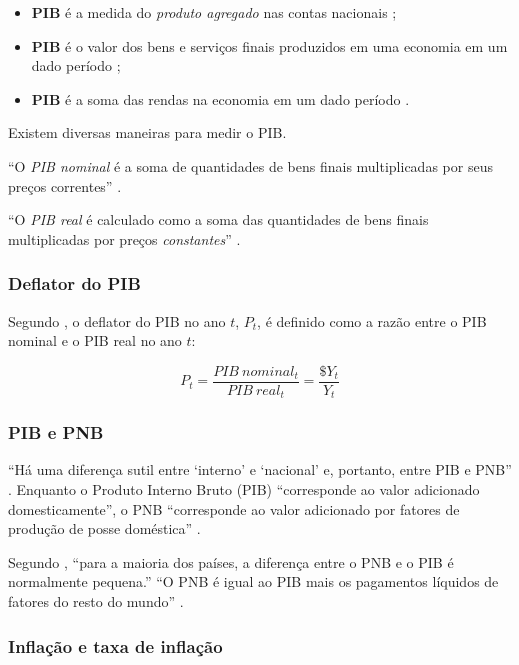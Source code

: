 \documentclass[]{article}
\providecommand{\tightlist}{%
  \setlength{\itemsep}{0pt}\setlength{\parskip}{0pt}}
\begin{document}
\begin{itemize}
\tightlist
\item
  \textbf{PIB} é a medida do \emph{produto agregado} nas contas
  nacionais \cite[p.~20]{blanchard};
\item
  \textbf{PIB} é o valor dos bens e serviços finais produzidos em uma
  economia em um dado período \cite[p.~21]{blanchard};
\item
  \textbf{PIB} é a soma das rendas na economia em um dado período
  \cite[p.~21]{blanchard}.
\end{itemize}

Existem diversas maneiras para medir o PIB.

``O \emph{PIB nominal} é a soma de quantidades de bens finais
multiplicadas por seus preços correntes'' \cite[p.~22]{blanchard}.

``O \emph{PIB real} é calculado como a soma das quantidades de bens
finais multiplicadas por preços \emph{constantes}''
\cite[p.~22]{blanchard}.

\subsubsection{Deflator do PIB}\label{subsec:deflator}

Segundo \cite[p.~29]{blanchard}, o deflator do PIB no ano \(t\),
\(P_t\), é definido como a razão entre o PIB nominal e o PIB real no ano
\(t\):

\[P_t = \frac{PIB\: nominal_t}{PIB\: real_t} = \frac{\$Y_t}{Y_t}\]

\subsubsection{PIB e PNB}\label{pib-e-pnb}

``Há uma diferença sutil entre `interno' e `nacional' e, portanto, entre
PIB e PNB'' \cite[p.~20]{blanchard}. Enquanto o Produto Interno Bruto
(PIB) ``corresponde ao valor adicionado domesticamente'', o PNB
``corresponde ao valor adicionado por fatores de produção de posse
doméstica'' \cite[p.~363]{blanchard}.

Segundo \cite{blanchard}, ``para a maioria dos países, a diferença entre
o PNB e o PIB é normalmente pequena.'' ``O PNB é igual ao PIB mais os
pagamentos líquidos de fatores do resto do mundo''
\cite[p.~363]{blanchard}.

\subsubsection{Inflação e taxa de
inflação}\label{inflacao-e-taxa-de-inflacao}
\end{document}

